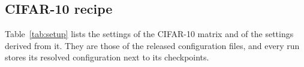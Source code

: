 
\subsection{CIFAR-10 recipe}
\label{app:setup-cifar}

Table~\ref{tab:setup} lists the settings of the CIFAR-10 matrix and of the
settings derived from it. They are those of the released configuration files,
and every run stores its resolved configuration next to its checkpoints.

